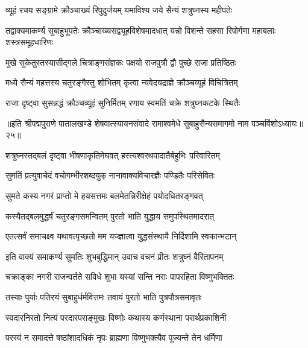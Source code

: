 \twolineshloka
{व्यूहं रचय सङ्ग्रामे क्रौञ्चाख्यं रिपुदुर्जयम्}
{यमाविश्य जये सैन्यं शत्रुघ्नस्य महीपतेः}%

\fourlineindentedshloka
{तद्वाक्यमाकर्ण्य सुबाहुभूपतेः}
{क्रौञ्चाख्यसद्व्यूहविशेषमादधात्}
{यन्नो विशन्ते सहसा रिपोर्गणा}
{महाबलाः शस्त्रसमूहधारिणः}%

\twolineshloka
{मुखे सुकेतुस्तस्यासीद्गले चित्राङ्गसंज्ञकः}
{पक्षयो राजपुत्रौ द्वौ पुच्छे राजा प्रतिष्ठितः}%

\twolineshloka
{मध्ये सैन्यं महत्तस्य चतुरङ्गैस्तु शोभितम्}
{कृत्वा न्यवेदयद्राज्ञे क्रौञ्चव्यूहं विचित्रितम्}%

\twolineshloka
{राजा दृष्ट्वा सुसन्नद्धं क्रौञ्चव्यूहं सुनिर्मितम्}
{रणाय स्वमतिं चक्रे शत्रुघ्नकटके स्थितैः}%

॥इति श्रीपद्मपुराणे पातालखण्डे शेषवात्स्यायनसंवादे रामाश्वमेधे सुबाहुसैन्यसमागमो नाम पञ्चविंशोऽध्यायः॥२५॥



\twolineshloka
{शत्रुघ्नस्तद्बलं दृष्ट्वा भीषणाकृतिमेघवत्}
{हस्त्यश्वरथपादातैर्बहुभिः परिवारितम्}%

\twolineshloka
{सुमतिं प्रत्युवाचेदं वचोगम्भीरशब्दयुक्}
{नानावाक्यविचारज्ञैः पण्डितैः परिसेवितः}%


\twolineshloka
{सुमते कस्य नगरं प्राप्तो मे हयसत्तमः}
{बलमेतन्निरीक्षेहं पयोदधितरङ्गवत्}%

\twolineshloka
{कस्यैतद्बलमुद्धर्षं चतुरङ्गसमन्वितम्}
{पुरतो भाति युद्धाय समुपस्थितमादरात्}%

\twolineshloka
{एतत्सर्वं समाचक्ष्व यथावत्पृच्छतो मम}
{यज्ज्ञात्वा युद्धसंस्थायै निर्दिशामि स्वकान्भटान्}%

\twolineshloka
{इति वाक्यं समाकर्ण्य सुमतिः शुभबुद्धिमान्}
{उवाच वचनं प्रीतः शत्रुघ्नं वैरितापनम्}%


\twolineshloka
{चक्राङ्का नगरी राजन्वर्तते सविधे शुभा}
{यस्यां सन्ति नराः पापरहिता विष्णुभक्तितः}%

\twolineshloka
{तस्याः पुर्याः पतिरयं सुबाहुर्धर्मवित्तमः}
{तवायं पुरतो भाति पुत्रपौत्रसमावृतः}%

\twolineshloka
{स्वदारनिरतो नित्यं परदारपराङ्मुखः}
{विष्णोः कथास्य कर्णस्थाना परार्थप्रकाशिनी}%

\twolineshloka
{परस्वं न समादत्ते षष्ठांशादधिकं नृपः}
{ब्राह्मणा विष्णुभक्त्यैव पूज्यन्ते तेन धर्मिणा}%

